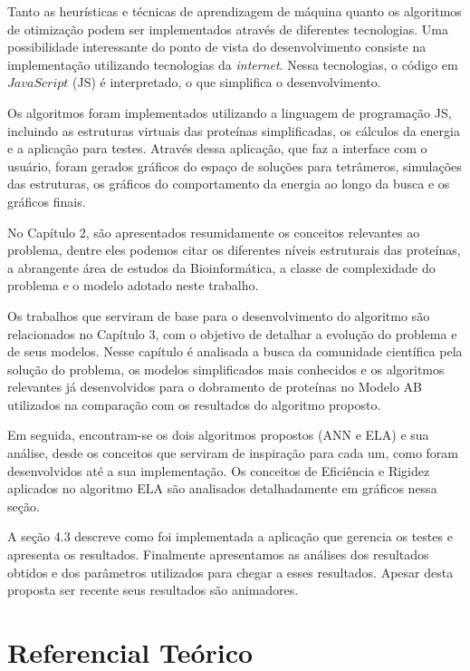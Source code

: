\documentclass[dm,ppgcomp]{texfurg}
\begin{document}
Tanto as heurísticas e técnicas de aprendizagem de máquina quanto os algoritmos de otimização podem ser implementados através de diferentes tecnologias. Uma  possibilidade interessante do ponto de vista do desenvolvimento consiste na implementação utilizando tecnologias da {\it internet}. Nessa tecnologias, o código em $JavaScript$ (JS) é interpretado, o que simplifica o desenvolvimento.

Os algoritmos foram implementados utilizando a linguagem de programação JS, incluindo as estruturas virtuais das proteínas simplificadas, os cálculos da energia e a aplicação para testes. Através dessa aplicação, que faz a interface com o usuário, foram gerados gráficos do espaço de soluções para tetrâmeros, simulações das estruturas, os gráficos do comportamento da energia ao longo da busca e os gráficos finais.

No Capítulo 2, são apresentados resumidamente os conceitos relevantes ao problema, dentre eles podemos citar os diferentes níveis estruturais das proteínas, a abrangente área de estudos da Bioinformática, a classe de complexidade do problema e o modelo adotado neste trabalho. 

Os trabalhos que serviram de base para o desenvolvimento do algoritmo são relacionados no Capítulo 3, com o objetivo de detalhar a evolução do problema e de seus modelos. Nesse capítulo é analisada a busca da comunidade científica pela solução do problema, os modelos simplificados mais conhecidos e os algoritmos relevantes já desenvolvidos para o dobramento de proteínas no Modelo AB utilizados na comparação com os resultados do algoritmo proposto.

Em seguida, encontram-se os dois algoritmos propostos (ANN e ELA) e sua análise, desde os conceitos que serviram de inspiração para cada um, como foram desenvolvidos até a sua implementação. Os conceitos de Eficiência e Rigidez aplicados no algoritmo ELA são analisados detalhadamente em gráficos nessa seção.

A seção 4.3 descreve como foi implementada a aplicação que gerencia os testes e apresenta os resultados. Finalmente apresentamos as análises dos resultados obtidos e dos parâmetros utilizados para chegar a esses resultados. Apesar desta proposta ser recente seus resultados são animadores.

\chapter{Referencial Teórico}
\end{document}
